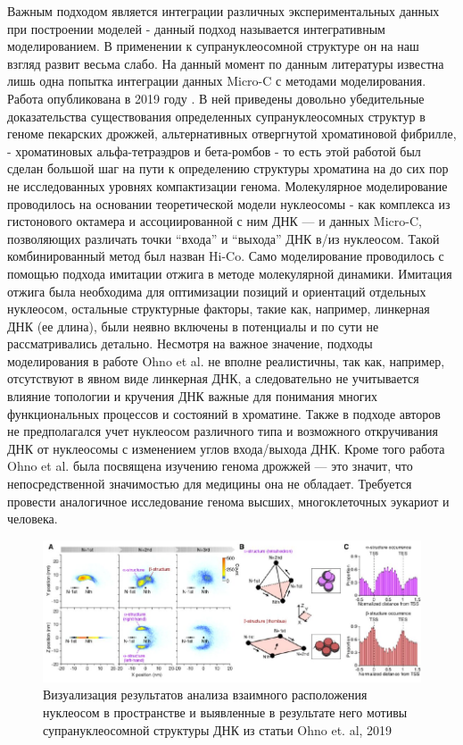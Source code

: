     Важным подходом является интеграции различных экспериментальных данных при построении моделей - данный подход называется интегративным моделированием. В применении к супрануклеосомной структуре он на наш взгляд развит весьма слабо. На данный момент по данным литературы известна лишь одна попытка интеграции данных Micro-C с методами моделирования. Работа опубликована в 2019 году \cite{ohno_sub-nucleosomal_2019}. В ней приведены довольно убедительные доказательства существования определенных супрануклеосомных структур в геноме пекарских дрожжей, альтернативных отвергнутой  хроматиновой фибрилле, - хроматиновых альфа-тетраэдров и бета-ромбов - то есть этой работой был сделан большой шаг на пути к определению структуры хроматина на до сих пор не исследованных уровнях компактизации генома. Молекулярное моделирование проводилось на основании теоретической модели нуклеосомы - как комплекса из гистонового октамера и ассоциированной с ним ДНК — и данных Micro-C, позволяющих различать точки ``входа'' и ``выхода'' ДНК в/из нуклеосом. Такой комбинированный метод был назван Hi-Co. Само моделирование проводилось с помощью подхода имитации отжига в методе молекулярной динамики. Имитация отжига была необходима для оптимизации позиций и ориентаций отдельных нуклеосом, остальные структурные факторы, такие как, например,  линкерная ДНК (ее длина), были неявно включены в потенциалы и по сути не рассматривались детально. Несмотря на важное значение, подходы моделирования в работе Ohno et al.  не вполне реалистичны, так как, например,  отсутствуют в явном виде линкерная ДНК, а следовательно не учитывается влияние топологии и кручения ДНК важные для понимания многих функциональных процессов и состояний в хроматине. Также в подходе авторов не предполагался учет нуклеосом различного типа и возможного откручивания ДНК от нуклеосомы с изменением углов входа/выхода ДНК. Кроме того работа Ohno et al. была посвящена изучению генома дрожжей — это значит, что непосредственной значимостью для медицины она не обладает. Требуется провести аналогичное исследование генома высших, многоклеточных эукариот и человека.

\begin{figure} [h!]
    \centering
    \includegraphics[width=\textwidth]{images/p1/part1_4_cm/part1_4_cm_f7.pdf}
    \caption[Визуализация анализа данные Micro-C, Ohno et al., 2019]{Визуализация результатов анализа взаимного расположения нуклеосом в пространстве и выявленные в результате него мотивы супрануклеосомной структуры ДНК из статьи Ohno et. al, 2019}
    \label{fig:p1_4:f7}
\end{figure}

